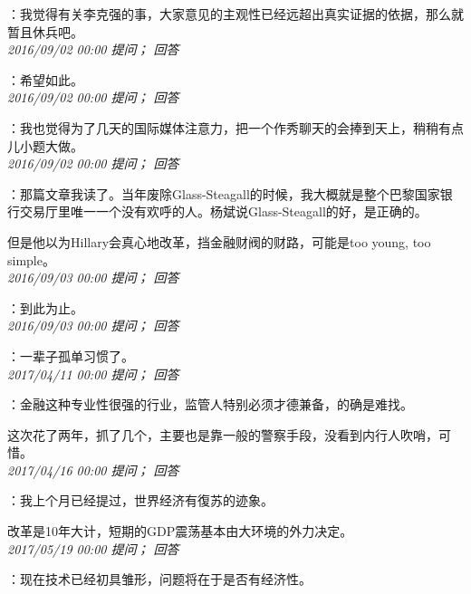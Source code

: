 \documentclass[twocolumn]{ctexart}
\begin{document}
：我觉得有关李克强的事，大家意见的主观性已经远超出真实证据的依据，那么就暂且休兵吧。\\

\textit{\hfill\noindent\small 2016/09/02 00:00 提问； 回答}

：希望如此。\\

\textit{\hfill\noindent\small 2016/09/02 00:00 提问； 回答}

：我也觉得为了几天的国际媒体注意力，把一个作秀聊天的会捧到天上，稍稍有点儿小题大做。\\

\textit{\hfill\noindent\small 2016/09/02 00:00 提问； 回答}

：那篇文章我读了。当年废除Glass-Steagall的时候，我大概就是整个巴黎国家银行交易厅里唯一一个没有欢呼的人。杨斌说Glass-Steagall的好，是正确的。

但是他以为Hillary会真心地改革，挡金融财阀的财路，可能是too young, too simple。\\

\textit{\hfill\noindent\small 2016/09/03 00:00 提问； 回答}

：到此为止。\\

\textit{\hfill\noindent\small 2016/09/03 00:00 提问； 回答}

：一辈子孤单习惯了。\\

\textit{\hfill\noindent\small 2017/04/11 00:00 提问； 回答}

：金融这种专业性很强的行业，监管人特别必须才德兼备，的确是难找。

这次花了两年，抓了几个，主要也是靠一般的警察手段，没看到内行人吹哨，可惜。\\

\textit{\hfill\noindent\small 2017/04/16 00:00 提问； 回答}

：我上个月已经提过，世界经济有復苏的迹象。

改革是10年大计，短期的GDP震荡基本由大环境的外力决定。\\

\textit{\hfill\noindent\small 2017/05/19 00:00 提问； 回答}

：现在技术已经初具雏形，问题将在于是否有经济性。\\
\end{document}
